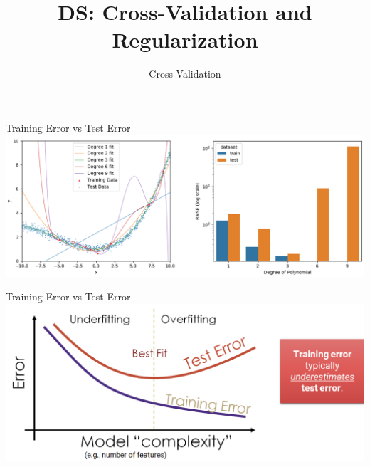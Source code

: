 \documentclass[aspectratio=169]{../latex_main/tntbeamer}  %
\title[Introduction]{DS: Cross-Validation and Regularization}
\subtitle{Cross-Validation}
\begin{document}
	
	\maketitle
	\begin{frame}{Training Error vs Test Error}
	    \includegraphics[scale=.4]{Bild1}
	\end{frame}
	
	
	\begin{frame}{Training Error vs Test Error}
	    \includegraphics[scale=.4]{Bild2}
	\end{frame}
	
\end{document}
